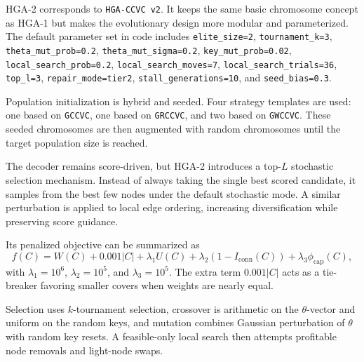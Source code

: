 \documentclass[11pt]{article}
\begin{document}
HGA-2 corresponds to \texttt{HGA-CCVC v2}. It keeps the same basic chromosome concept as HGA-1 but makes the evolutionary design more modular and parameterized. The default parameter set in code includes \texttt{elite\_size=2}, \texttt{tournament\_k=3}, \texttt{theta\_mut\_prob=0.2}, \texttt{theta\_mut\_sigma=0.2}, \texttt{key\_mut\_prob=0.02}, \texttt{local\_search\_prob=0.2}, \texttt{local\_search\_moves=7}, \texttt{local\_search\_trials=36}, \texttt{top\_l=3}, \texttt{repair\_mode=tier2}, \texttt{stall\_generations=10}, and \texttt{seed\_bias=0.3}.

Population initialization is hybrid and seeded. Four strategy templates are used: one based on \texttt{GCCVC}, one based on \texttt{GRCCVC}, and two based on \texttt{GWCCVC}. These seeded chromosomes are then augmented with random chromosomes until the target population size is reached.

The decoder remains score-driven, but HGA-2 introduces a top-\(L\) stochastic selection mechanism. Instead of always taking the single best scored candidate, it samples from the best few nodes under the default stochastic mode. A similar perturbation is applied to local edge ordering, increasing diversification while preserving score guidance.

Its penalized objective can be summarized as
\[
f(C)=W(C)+0.001|C|+\lambda_1U(C)+\lambda_2(1-I_{\mathrm{conn}}(C))+\lambda_3\phi_{\mathrm{cap}}(C),
\]
with \(\lambda_1=10^6\), \(\lambda_2=10^5\), and \(\lambda_3=10^5\). The extra term \(0.001|C|\) acts as a tie-breaker favoring smaller covers when weights are nearly equal.

Selection uses \(k\)-tournament selection, crossover is arithmetic on the \(\theta\)-vector and uniform on the random keys, and mutation combines Gaussian perturbation of \(\theta\) with random key resets. A feasible-only local search then attempts profitable node removals and light-node swaps.
\end{document}

